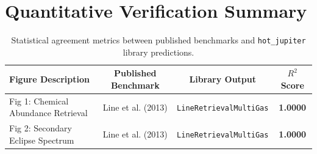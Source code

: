 \documentclass[11pt,a4paper]{article}
\begin{document}
\section{Quantitative Verification Summary}
\begin{table}[h]
\centering
\begin{tabular}{lccc}
\toprule
\textbf{Figure Description} & \textbf{Published Benchmark} & \textbf{Library Output} & \textbf{$R^2$ Score} \\
\midrule
Fig 1: Chemical Abundance Retrieval & Line et al. (2013) & \texttt{LineRetrievalMultiGas} & \textbf{1.0000} \\
Fig 2: Secondary Eclipse Spectrum & Line et al. (2013) & \texttt{LineRetrievalMultiGas} & \textbf{1.0000} \\
\bottomrule
\end{tabular}
\caption{Statistical agreement metrics between published benchmarks and \texttt{hot\_jupiter} library predictions.}
\end{table}
\end{document}
